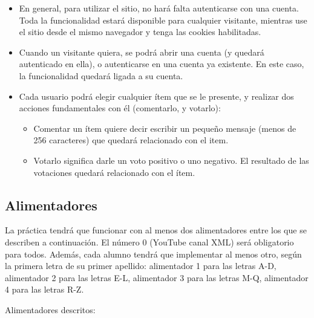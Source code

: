 \begin{itemize}
\item En general, para utilizar el sitio, no hará falta autenticarse con una cuenta. Toda la funcionalidad estará disponible para cualquier visitante, mientras use el sitio desde el mismo navegador y tenga las cookies habilitadas.

\item Cuando un visitante quiera, se podrá abrir una cuenta (y quedará autenticado en ella), o autenticarse en una cuenta ya existente. En este caso, la funcionalidad quedará ligada a su cuenta.
  
\item Cada usuario podrá elegir cualquier ítem que se le presente, y realizar dos acciones fundamentales con él (comentarlo, y votarlo):
  \begin{itemize}
  \item Comentar un ítem quiere decir escribir un pequeño mensaje (menos de 256 caracteres) que quedará relacionado con el item.
  \item Votarlo significa darle un voto positivo o uno negativo. El resultado de las votaciones quedará relacionado con el ítem.
  \end{itemize}

\end{itemize}


\subsection{Alimentadores}
\label{practica-final-2020-05:alimentadores}

La práctica tendrá que funcionar con al menos dos alimentadores entre los que se describen a continuación. El número 0 (YouTube canal XML) será obligatorio para todos. Además, cada alumno tendrá que implementar al menos otro, según la primera letra de su primer apellido: alimentador 1 para las letras A-D, alimentador 2 para las letras E-L, alimentador 3 para las letras M-Q, alimentador 4 para las letras R-Z.

Alimentadores descritos:

